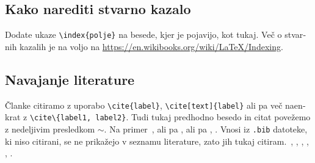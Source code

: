 \documentclass[12pt,a4paper,twoside]{article}
\newcommand{\literatura}{literatura}  %
\theoremstyle{definition} %
\theoremstyle{plain} %
\numberwithin{equation}{section}  %
\begin{document}
\begin{otherlanguage}{slovene}
\subsection{Kako narediti stvarno kazalo}
Dodate ukaze \verb|\index{polje}| na besede, kjer je pojavijo, kot tukaj.
Več o stvarnih kazalih je na voljo na \url{https://en.wikibooks.org/wiki/LaTeX/Indexing}.

\subsection{Navajanje literature}
Članke citiramo z uporabo \verb|\cite{label}|, \verb|\cite[text]{label}| ali pa več naenkrat z
\verb|\cite\{label1, label2}|. Tudi tukaj predhodno besedo in citat povežemo z nedeljivim presledkom
$\sim$. Na primer~\cite{chen2006meshless,liu2001point}, ali pa \cite{kibriya2007empirical}, ali pa
\cite[str.\ 12]{trobec2015parallel}, \cite[enačba (2.3)]{pereira2016convergence}.
Vnosi iz \verb|.bib| datoteke, ki niso citirani, se ne prikažejo v seznamu literature, zato jih
tukaj citiram.~\cite{vene2000categorical}, \cite{gregoric2017stopniceni}, \cite{slak2015induktivni},
\cite{nsphere}, \cite{kearsley1975linearly}, \cite{STtemplate}.

\end{otherlanguage}

\cleardoublepage                           %

\printindex
\end{document}
